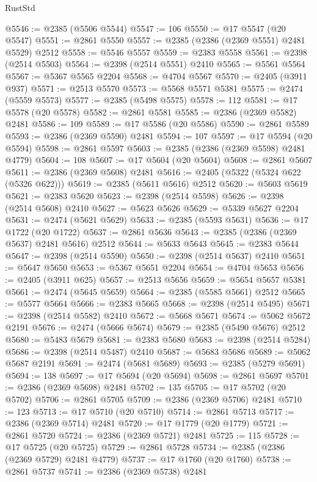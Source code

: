 \begin{lexlean}{RustStd}
\begin{coremodule}
{\begin{coremodule}
{{{{{{{{{{{{{{{{{{{{{{{{{{{{{{{{{{{{{{{{{{{{{{{{{{@5546 := @2385 (@5506 @5544)
@5547 := 106
@5550 := @17 @5547 (@20 @5547)
@5551 := @2861 @5550
@5557 := @2385 (@2386 (@2369 @5551) @2481 @5529) @2512
@5558 := @5546 @5557
@5559 := @2383 @5558
@5561 := @2398 (@2514 @5503)
@5564 := @2398 (@2514 @5551) @2410
@5565 := @5561 @5564
@5567 := @5367 @5565 @2204
@5568 := @4704 @5567
@5570 := @2405 (@3911 @937)
@5571 := @2513 @5570
@5573 := @5568 @5571 @5381
@5575 := @2474 (@5559 @5573)
@5577 := @2385 (@5498 @5575)
@5578 := 112
@5581 := @17 @5578 (@20 @5578)
@5582 := @2861 @5581
@5585 := @2386 (@2369 @5582) @2481
@5586 := 109
@5589 := @17 @5586 (@20 @5586)
@5590 := @2861 @5589
@5593 := @2386 (@2369 @5590) @2481
@5594 := 107
@5597 := @17 @5594 (@20 @5594)
@5598 := @2861 @5597
@5603 := @2385 (@2386 (@2369 @5598) @2481 @4779)
@5604 := 108
@5607 := @17 @5604 (@20 @5604)
@5608 := @2861 @5607
@5611 := @2386 (@2369 @5608) @2481
@5616 := @2405 (@5322 (@5324 @622 (@5326 @622)))
@5619 := @2385 (@5611 @5616) @2512
@5620 := @5603 @5619
@5621 := @2383 @5620
@5623 := @2398 (@2514 @5598)
@5626 := @2398 (@2514 @5608) @2410
@5627 := @5623 @5626
@5629 := @5339 @5627 @2204
@5631 := @2474 (@5621 @5629)
@5633 := @2385 (@5593 @5631)
@5636 := @17 @1722 (@20 @1722)
@5637 := @2861 @5636
@5643 := @2385 (@2386 (@2369 @5637) @2481 @5616) @2512
@5644 := @5633 @5643
@5645 := @2383 @5644
@5647 := @2398 (@2514 @5590)
@5650 := @2398 (@2514 @5637) @2410
@5651 := @5647 @5650
@5653 := @5367 @5651 @2204
@5654 := @4704 @5653
@5656 := @2405 (@3911 @625)
@5657 := @2513 @5656
@5659 := @5654 @5657 @5381
@5661 := @2474 (@5645 @5659)
@5664 := @2385 (@5585 @5661) @2512
@5665 := @5577 @5664
@5666 := @2383 @5665
@5668 := @2398 (@2514 @5495)
@5671 := @2398 (@2514 @5582) @2410
@5672 := @5668 @5671
@5674 := @5062 @5672 @2191
@5676 := @2474 (@5666 @5674)
@5679 := @2385 (@5490 @5676) @2512
@5680 := @5483 @5679
@5681 := @2383 @5680
@5683 := @2398 (@2514 @5284)
@5686 := @2398 (@2514 @5487) @2410
@5687 := @5683 @5686
@5689 := @5062 @5687 @2191
@5691 := @2474 (@5681 @5689)
@5693 := @2385 (@5279 @5691)
@5694 := 138
@5697 := @17 @5694 (@20 @5694)
@5698 := @2861 @5697
@5701 := @2386 (@2369 @5698) @2481
@5702 := 135
@5705 := @17 @5702 (@20 @5702)
@5706 := @2861 @5705
@5709 := @2386 (@2369 @5706) @2481
@5710 := 123
@5713 := @17 @5710 (@20 @5710)
@5714 := @2861 @5713
@5717 := @2386 (@2369 @5714) @2481
@5720 := @17 @1779 (@20 @1779)
@5721 := @2861 @5720
@5724 := @2386 (@2369 @5721) @2481
@5725 := 115
@5728 := @17 @5725 (@20 @5725)
@5729 := @2861 @5728
@5734 := @2385 (@2386 (@2369 @5729) @2481 @4779)
@5737 := @17 @1760 (@20 @1760)
@5738 := @2861 @5737
@5741 := @2386 (@2369 @5738) @2481
}}}}}}}}}}}}}}}}}}}}}}}}}}}}}}}}}}}}}}}}}}}}}}}}}}
\end{coremodule}}
\end{coremodule}
\end{lexlean}
